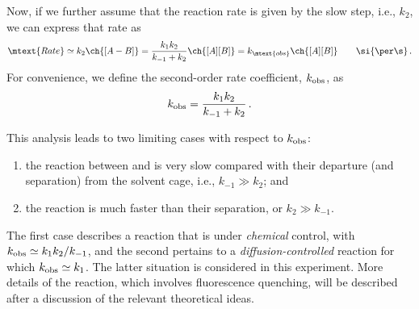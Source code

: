 Now, if we further assume that the reaction rate is given by the slow step, i.e., \( k_2 \)\ch{[A-B]}, we can express that rate as
\[
	\mtext{Rate} \simeq k_2 \ch{[A-B]} = \frac{k_1 k_2}{k_{-1} + k_2} \ch{[A][B]} = k_\mtext{obs}\ch{[A][B]} \qquad \si{ \per \s} \, .
\]
For convenience, we define the second-order rate coefficient, \( k_\textup{obs} \), as 
\begin{equation}
	k_\textup{obs} = \frac{k_1 k_2}{k_{-1} + k_2} \, .
	\label{eq:k_obs}
\end{equation}

This analysis leads to two limiting cases with respect to \( k_\textup{obs} \): 
\begin{enumerate}
	\item the reaction between  and  is very slow compared with their departure (and separation) from the solvent cage, i.e., \( k_{-1} \gg k_2 \); and 
	\item the  reaction is much faster than their separation, or \( k_2 \gg k_{-1} \). 
\end{enumerate}
The first case describes a reaction that is under \emph{chemical} control, with \( k_\textup{obs} \simeq k_1 k_2 / k_{-1} \), and the second pertains to a \emph{diffusion-controlled} reaction for which \( k_\textup{obs} \simeq k_1 \). 
The latter situation is considered in this experiment. More details of the reaction, which involves fluorescence quenching, will be described after a discussion of the relevant theoretical ideas. 

